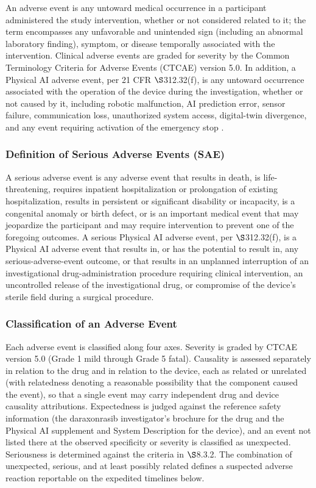 An adverse event is any untoward medical occurrence in a participant administered the
study intervention, whether or not considered related to it; the term encompasses
any unfavorable and unintended sign (including an abnormal laboratory finding),
symptom, or disease temporally associated with the intervention. Clinical adverse
events are graded for severity by the Common Terminology Criteria for Adverse Events
(CTCAE) version 5.0. In addition, a Physical AI adverse event, per 21 CFR
$\S$312.32(f), is any untoward occurrence associated with the operation of the
device during the investigation, whether or not caused by it, including robotic
malfunction, AI prediction error, sensor failure, communication loss, unauthorized
system access, digital-twin divergence, and any event requiring activation of the
emergency stop \cite{kawchak2026adapt312}.

\subsubsection{Definition of Serious Adverse Events (SAE)}

A serious adverse event is any adverse event that results in death, is
life-threatening, requires inpatient hospitalization or prolongation of existing
hospitalization, results in persistent or significant disability or incapacity, is a
congenital anomaly or birth defect, or is an important medical event that may
jeopardize the participant and may require intervention to prevent one of the
foregoing outcomes. A serious Physical AI adverse event, per $\S$312.32(f), is a
Physical AI adverse event that results in, or has the potential to result in, any
serious-adverse-event outcome, or that results in an unplanned interruption of an
investigational drug-administration procedure requiring clinical intervention, an
uncontrolled release of the investigational drug, or compromise of the device's
sterile field during a surgical procedure.

\clearpage

\subsubsection{Classification of an Adverse Event}

Each adverse event is classified along four axes. Severity is graded by CTCAE
version 5.0 (Grade 1 mild through Grade 5 fatal). Causality is assessed separately
in relation to the drug and in relation to the device, each as related or unrelated
(with relatedness denoting a reasonable possibility that the component caused the
event), so that a single event may carry independent drug and device causality
attributions. Expectedness is judged against the reference safety information (the
daraxonrasib investigator's brochure for the drug and the Physical AI supplement
and System Description for the device), and an event not listed there at the
observed specificity or severity is classified as unexpected. Seriousness is
determined against the criteria in $\S$8.3.2. The combination of unexpected, serious,
and at least possibly related defines a suspected adverse reaction reportable on the
expedited timelines below.

